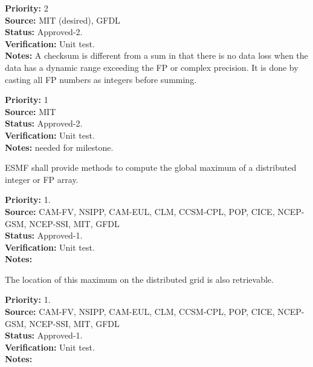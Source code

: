\begin{reqlist}
{\bf Priority:} 2 \\
{\bf Source:} MIT (desired), GFDL \\
{\bf Status:} Approved-2. \\
{\bf Verification:} Unit test. \\
{\bf Notes:} A checksum is different from a sum in that there is no
  data loss when the data has a dynamic range exceeding the FP or
  complex precision. It is done by casting all FP numbers as integers
  before summing.
\end{reqlist}


\begin{reqlist}
{\bf Priority:} 1 \\
{\bf Source:} MIT \\
{\bf Status:} Approved-2. \\
{\bf Verification:} Unit test. \\
{\bf Notes:} needed for milestone.
\end{reqlist}


ESMF shall provide methods to compute the global maximum of a
distributed integer or FP array.

\begin{reqlist}
{\bf Priority:} 1. \\ 
{\bf Source:} CAM-FV, NSIPP, CAM-EUL, CLM, CCSM-CPL, POP, CICE, NCEP-GSM, NCEP-SSI, MIT, GFDL \\
{\bf Status:} Approved-1. \\
{\bf Verification:} Unit test. \\
{\bf Notes:}
\end{reqlist}



The location of this maximum on the distributed grid is also
retrievable.

\begin{reqlist}
{\bf Priority:} 1. \\ 
{\bf Source:} CAM-FV, NSIPP, CAM-EUL, CLM, CCSM-CPL, POP, CICE, NCEP-GSM, NCEP-SSI, MIT, GFDL \\
{\bf Status:} Approved-1. \\
{\bf Verification:} Unit test. \\
{\bf Notes:}
\end{reqlist}


